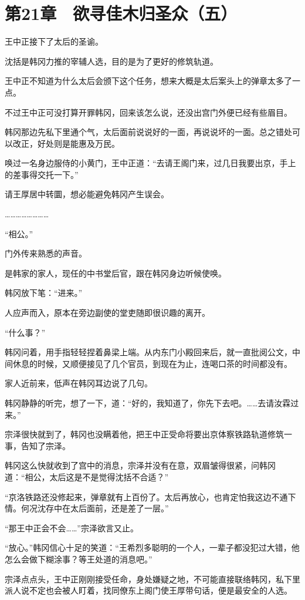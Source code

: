 \section{第21章　欲寻佳木归圣众（五）}

王中正接下了太后的圣谕。

沈括是韩冈力推的宰辅人选，目的是为了更好的修筑轨道。

王中正不知道为什么太后会颁下这个任务，想来大概是太后案头上的弹章太多了一点。

不过王中正可没打算开罪韩冈，回来该怎么说，还没出宫门外便已经有些眉目。

韩冈那边先私下里通个气，太后面前说说好的一面，再说说坏的一面。总之错处可以改正，好处则是能惠及万民。

唤过一名身边服侍的小黄门，王中正道：“去请王阁门来，过几日我要出京，手上的差事得交托一下。”

请王厚居中转圜，想必能避免韩冈产生误会。

……………………

“相公。”

门外传来熟悉的声音。

是韩家的家人，现任的中书堂后官，跟在韩冈身边听候使唤。

韩冈放下笔：“进来。”

人应声而入，原本在旁边副使的堂吏随即很识趣的离开。

“什么事？”

韩冈问着，用手指轻轻捏着鼻梁上端。从内东门小殿回来后，就一直批阅公文，中间休息的时候，又顺便接见了几个官员，到现在为止，连喝口茶的时间都没有。

家人近前来，低声在韩冈耳边说了几句。

韩冈静静的听完，想了一下，道：“好的，我知道了，你先下去吧。……去请汝霖过来。”

宗泽很快就到了，韩冈也没瞒着他，把王中正受命将要出京体察铁路轨道修筑一事，告知了宗泽。

韩冈这么快就收到了宫中的消息，宗泽并没有在意，双眉皱得很紧，问韩冈道：“相公，太后这是不是觉得沈括不合适？”

“京洛铁路还没修起来，弹章就有上百份了。太后再放心，也肯定怕我这边不通下情。何况沈存中在太后面前，还是差了一层。”

“那王中正会不会……”宗泽欲言又止。

“放心。”韩冈信心十足的笑道：“王希烈多聪明的一个人，一辈子都没犯过大错，他怎么会做下糊涂事？等王处道的消息吧。”

宗泽点点头，王中正刚刚接受任命，身处嫌疑之地，不可能直接联络韩冈，私下里派人说不定也会被人盯着，找同僚东上阁门使王厚带句话，便是最安全的人选。

